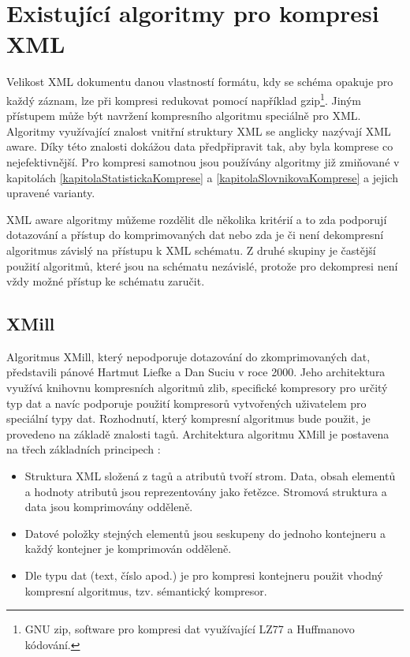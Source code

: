 \chapter{Existující algoritmy pro kompresi XML}
\label{kapitolaXmlAlgoritmy}

Velikost XML dokumentu danou vlastností formátu, kdy se schéma opakuje pro každý záznam, lze při kompresi redukovat pomocí například gzip\footnote{GNU zip, software pro kompresi dat využívající LZ77 a Huffmanovo kódování.}. Jiným přístupem může být navržení kompresního algoritmu speciálně pro XML. Algoritmy využívající znalost vnitřní struktury XML se anglicky nazývají XML aware. Díky této znalosti dokážou data před\-při\-pra\-vit tak, aby byla komprese co nejefektivnější. Pro kompresi samotnou jsou používány algoritmy již zmiňované v kapitolách \ref{kapitolaStatistickaKomprese} a \ref{kapitolaSlovnikovaKomprese} a jejich upravené varianty.

XML aware algoritmy můžeme rozdělit dle několika kritérií a to zda podporují dotazování a přístup do komprimovaných dat nebo zda je či není dekompresní algoritmus závislý na přístupu k XML schématu. Z druhé skupiny je častější použití algoritmů, které jsou na schématu nezávislé, protože pro dekompresi není vždy možné přístup ke schématu zaručit.

\section{XMill}
\label{xmill}
Algoritmus XMill, který nepodporuje dotazování do zkomprimovaných dat, představili pánové Hartmut Liefke a Dan Suciu v roce 2000. Jeho architektura využívá knihovnu kompresních algoritmů zlib, specifické kompresory pro určitý typ dat a navíc podporuje použití kompresorů vytvořených uživatelem pro speciální typy dat. Rozhodnutí, který kompresní algoritmus bude použit, je provedeno na základě znalosti tagů. Architektura algoritmu XMill je postavena na třech základních principech \cite{xmill}:

\begin{itemize}
\item Struktura XML složená z tagů a atributů tvoří strom. Data, obsah elementů a hodnoty atributů jsou reprezentovány jako řetězce. Stromová struktura a data jsou komprimovány odděleně.
\item Datové položky stejných elementů jsou seskupeny do jednoho kontejneru a každý kontejner je komprimován odděleně.
\item Dle typu dat (text, číslo apod.) je pro kompresi kontejneru použit vhodný kompresní algoritmus, tzv. sémantický kompresor.
\end{itemize}


